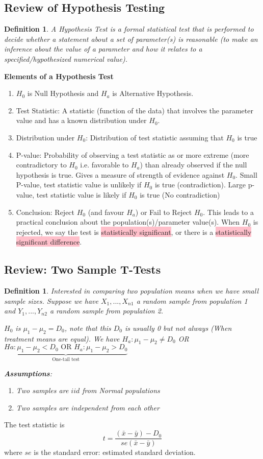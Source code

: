 \documentclass[a4paper,11pt]{article}
\newtheorem{defn}[thm]{Definition}
\begin{document}
\subsection{Review of Hypothesis Testing}
\begin{defn}
\normalfont
A Hypothesis Test is a formal statistical test that is performed to decide whether a statement about a set of parameter(s) is reasonable (to make an inference about the value of a parameter and how it relates to a specified/hypothesized numerical value). 
\end{defn}
\textbf{Elements of a Hypothesis Test}
\begin{enumerate}
\item $H_0$ is Null Hypothesis and $H_a$ is Alternative Hypothesis. 
\item Test Statistic: A statistic (function of the data) that involves the parameter value and has a known distribution under $H_0$.
\item Distribution under $H_0$: Distribution of test statistic assuming that $H_0$ is true
\item P-value: Probability of observing a test statistic as or more extreme (more contradictory to $H_0$ i.e. favorable to $H_a$) than already observed if the null hypothesis is true. Gives a measure of strength of evidence against $H_0$. Small P-value, test statistic value is unlikely if $H_0$ is true (contradiction). Large p-value, test statistic value is likely if $H_0$ is true (No contradiction)
\item Conclusion: Reject $H_0$ (and favour $H_a$) or Fail to Reject $H_0$. This leads to a practical conclusion about the population(s)/parameter value(s). When $H_0$ is rejected, we say the test is \colorbox{pink}{statistically significant}, or there is a \colorbox{pink}{statistically significant difference}. 
\end{enumerate}
\subsection{Review: Two Sample T-Tests}
\begin{defn}
\normalfont
Interested in comparing two population means when we have small sample sizes. Suppose we have $X_1,...,X_{n1}$ a random sample from population 1 and $Y_1,...,Y_{n2}$ a random sample from population 2. 

$H_0$ is $\mu_1-\mu_2=D_0$, note that this $D_0$ is usually 0 but not always (When treatment means are equal). We have $H_a:\mu_1-\mu_2\neq D_0$ OR $\underbrace{Ha: \mu_1-\mu_2<D_0 \text{ OR } H_a:\mu_1-\mu_2>D_0}_\text{One-tail test}$

\textbf{Assumptions}: 
\begin{enumerate}
\item Two samples are $iid$ from Normal populations
\item Two samples are independent from each other
\end{enumerate}
\end{defn}
The test statistic is
$$t=\frac{(\bar{x}-\bar{y})-D_0}{se(\bar{x}-\bar{y})}$$
where $se$ is the standard error: estimated standard deviation. 
\end{document}
